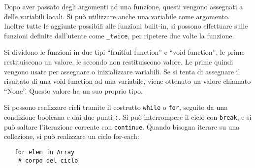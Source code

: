 \documentclass{article}
\numberwithin{equation}{subsection}
\begin{document}
Dopo aver passato degli argomenti ad una funzione, questi vengono assegnati a delle variabili locali. Si può utilizzare anche una variabile come argomento. Inoltre 
tutte le aggiunte possibili alle funzioni built-in, si possono effettuare sulle funzioni definite dall'utente come \verb|_twice|, per ripetere due volte la funzione. 

Si dividono le funzioni in due tipi ``fruitful function'' e ``void function'',  le prime restituiscono un valore, le secondo non restituiscono valore. Le prime quindi 
vengono usate per assegnare o inizializzare variabili. Se si tenta di assegnare il risultato di una void function ad una variabile, viene ottenuto un valore chiamato ``None''. 
Questo valore ha un suo proprio tipo. 

Si possono realizzare cicli tramite il costrutto \verb|while| o \verb|for|, seguito da una condizione booleana e dai due punti \verb|:|. 
Si può interrompere il ciclo con \verb|break|, e si può saltare l'iterazione corrente con \verb|continue|. Quando bisogna iterare su una collezione, si può realizzare 
un ciclo for-each:
\begin{verbatim}
   for elem in Array
    # corpo del ciclo
\end{verbatim}
\end{document}
